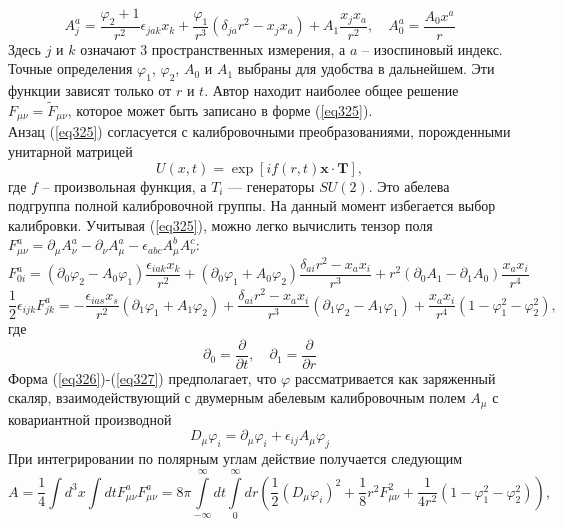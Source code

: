 \documentclass[12pt]{article}
\theoremstyle{definition}
\begin{document}
\begin{equation}\label{eq325}
    A^a_j=\frac{\varphi_2+1}{r^2}\epsilon_{jak}x_k+\frac{\varphi_1}{r^3}(\delta_{ja}r^2-x_jx_a)+A_1\frac{x_jx_a}{r^2},\quad A_0^a=\frac{A_0x^a}{r}
\end{equation}
Здесь $j$ и $k$ означают 3 пространственных измерения, а $a$ -- изоспиновый индекс. Точные определения $\varphi_1$, $\varphi_2$, $A_0$ и $A_1$ выбраны для удобства в дальнейшем. Эти функции зависят только от $r$ и $t$. Автор находит наиболее общее решение $F_{\mu\nu}=\tilde{F}_{\mu\nu}$, которое может быть записано в форме (\ref{eq325}).\\
Анзац (\ref{eq325}) согласуется с калибровочными преобразованиями, порожденными унитарной матрицей 
\begin{equation}
    U(x,t)=\exp[if(r,t)\bm{x}\cdot\bm{T}],
\end{equation}
где $f$ -- произвольная функция, а $T_i$ --- генераторы $SU(2)$. Это абелева подгруппа полной калибровочной группы. На данный момент избегается выбор калибровки. Учитывая (\ref{eq325}), можно легко вычислить тензор поля $F^a_{\mu\nu}=\partial_\mu A^a_\nu-\partial_\nu A^a_\mu-\epsilon_{abc}A_\mu^bA_\nu^c$:
\begin{equation}\label{eq326}
    F^a_{0i}=(\partial_0\varphi_2-A_0\varphi_1)\frac{\epsilon_{iak}x_k}{r^2}+(\partial_0\varphi_1+A_0\varphi_2)\frac{\delta_{ai}r^2-x_ax_i}{r^3}+r^2(\partial_0A_1-\partial_1A_0)\frac{x_ax_i}{r^4}
\end{equation}
\begin{equation}\label{eq327}
    \frac{1}{2}\epsilon_{ijk}F^a_{jk}=-\frac{\epsilon_{ias}x_s}{r^2}(\partial_1\varphi_1+A_1\varphi_2)+\frac{\delta_{ai}r^2-x_ax_i}{r^3}(\partial_1\varphi_2-A_1\varphi_1)+\frac{x_ax_i}{r^4}(1-\varphi_1^2-\varphi_2^2),
\end{equation}
где
\begin{equation}
    \partial_0=\frac{\partial}{\partial t},\quad\partial_1=\frac{\partial}{\partial r}
\end{equation}
Форма (\ref{eq326})-(\ref{eq327}) предполагает, что $\varphi$ рассматривается как заряженный скаляр, взаимодействующий с двумерным абелевым калибровочным полем $A_\mu$ с ковариантной производной
\begin{equation}
    D_\mu\varphi_i=\partial_\mu\varphi_i+\epsilon_{ij}A_\mu\varphi_j
\end{equation}
При интегрировании по полярным углам действие получается следующим
\begin{equation}\label{eq328}
    A=\frac{1}{4}\int d^3x\int dtF^a_{\mu\nu}F^a_{\mu\nu}=8\pi\int\limits_{-\infty}^\infty dt\int\limits_0^\infty dr\left(\frac{1}{2}(D_\mu\varphi_i)^2+\frac{1}{8}r^2F_{\mu\nu}^2+\frac{1}{4r^2}(1-\varphi_1^2-\varphi_2^2)\right),
\end{equation}
\end{document}
